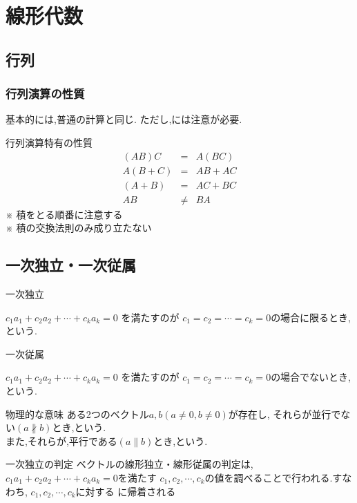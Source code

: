 \documentclass[a4paper]{jsarticle}
\begin{document}
\section{線形代数}
\subsection{行列}
\subsubsection{行列演算の性質}
基本的には,普通の計算と同じ.
ただし,には注意が必要.
\begin{itembox}[l]{行列演算特有の性質}
    \begin{eqnarray*}
        \left(AB\right)C&=&A\left(BC\right)\\
        A\left(B+C\right)&=&AB+AC\\
        \left(A+B\right)&=&AC+BC\\
        AB&\neq& BA
    \end{eqnarray*}
    ※ 積をとる順番に注意する\\
    ※ 積の交換法則のみ成り立たない
\end{itembox}
\subsection{一次独立・一次従属}
\begin{itembox}[l]{一次独立}
    \begin{center}
        $c_1a_1+c_2a_2+\cdots+c_ka_k=0$ を満たすのが $c_1=c_2=\cdots=c_k=0$の場合に限るとき,
        という.
    \end{center}
\end{itembox}
\begin{itembox}[l]{一次従属}
    \begin{center}
        $c_1a_1+c_2a_2+\cdots+c_ka_k=0$ を満たすのが $c_1=c_2=\cdots=c_k=0$の場合でないとき,
        という.
    \end{center}
\end{itembox}
\begin{itembox}[l]{物理的な意味}
    ある2つのベクトル$a,b\left(a\neq 0,b\neq 0\right)$が存在し,
    それらが並行でない$\left(a\not\parallel b\right)$とき,という.\\
    また,それらが,平行である$\left(a\parallel b\right)$とき,という.
\end{itembox}
\begin{itembox}[l]{一次独立の判定}
    ベクトルの線形独立・線形従属の判定は,$c_1a_1+c_2a_2+\cdots+c_ka_k=0$を満たす
    $c_1,c_2,\cdots,c_k$の値を調べることで行われる.すなわち, $c_1,c_2,\cdots,c_k$に対する
    に帰着される
\end{itembox}
\end{document}
